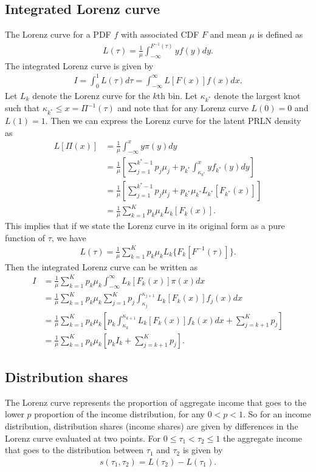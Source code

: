 \documentclass[12pt]{article}
\begin{document}
\subsection{Integrated Lorenz curve}
The Lorenz curve for a PDF $f$ with associated CDF $F$ and mean $\mu$ is defined as
\begin{align*}
  L(\tau) = \frac{1}{\mu}\int_{-\infty}^{F^{-1}(\tau)}y f(y) dy.
\end{align*}
The integrated Lorenz curve is given by
\begin{align*}
I = \int_0^1L(\tau)d\tau = \int_{-\infty}^{\infty}L[F(x)]f(x)dx.
\end{align*}
Let $L_k$ denote the Lorenz curve for the $k$th bin. Let $\kappa_{k^*}$ denote the largest knot such that $\kappa_{k^*} \leq x = \Pi^{-1}(\tau)$ and note that for any Lorenz curve $L(0)=0$ and $L(1)=1$.  Then we can express the Lorenz curve for the latent PRLN density as
\begin{align*}
  L[\Pi(x)] & = \frac{1}{\mu}\int_{-\infty}^x y \pi(y) dy \\
          & = \frac{1}{\mu}\left[\sum_{j=1}^{k^*-1}p_j\mu_j + p_{k^*}\int_{\kappa_{k^*}}^xyf_{k^*}(y)dy\right] \\
          & = \frac{1}{\mu}\left[\sum_{j=1}^{k^*-1}p_j\mu_j + p_{k^*}\mu_{k^*}L_{k^*}[F_{k^*}(x)]\right] \\
          & = \frac{1}{\mu}\sum_{k=1}^Kp_k\mu_kL_k[F_k(x)].
\end{align*}
This implies that if we state the Lorenz curve in its original form as a pure function of $\tau$, we have
\begin{align*}
L(\tau) = \frac{1}{\mu}\sum_{k=1}^Kp_k\mu_kL_k\{F_k[F^{-1}(\tau)]\}.
\end{align*}
Then the integrated Lorenz curve can be written as
\begin{align*}
  I & = \frac{1}{\mu}\sum_{k=1}^Kp_k\mu_k\int_{-\infty}^{\infty}L_k[F_k(x)]\pi(x)dx \\
  & = \frac{1}{\mu}\sum_{k=1}^Kp_k\mu_k\sum_{j=1}^Kp_j\int_{\kappa_j}^{\kappa_{j+1}}L_k[F_k(x)]f_j(x)dx \\
    & = \frac{1}{\mu}\sum_{k=1}^Kp_k\mu_k\left[p_k\int_{\kappa_{k}}^{\kappa_{k+1}}L_k[F_k(x)]f_k(x)dx + \sum_{j=k+1}^Kp_j\right] \\
    & = \frac{1}{\mu}\sum_{k=1}^{K}p_k\mu_k\left[p_kI_k + \sum_{j=k+1}^Kp_j\right].
\end{align*}

\subsection{Distribution shares}
The Lorenz curve represents the proportion of aggregate income that goes to the lower $p$ proportion of the income distribution, for any $0 < p < 1$. So for an income distribution, distribution shares (income shares) are given by differences in the Lorenz curve evaluated at two points. For $0\leq \tau_1 < \tau_2 \leq1$ the aggregate income that goes to the distribution between $\tau_1$ and $\tau_2$ is given by
\begin{align*}
s(\tau_1, \tau_2) = L(\tau_2) - L(\tau_1).
\end{align*}
\end{document}
